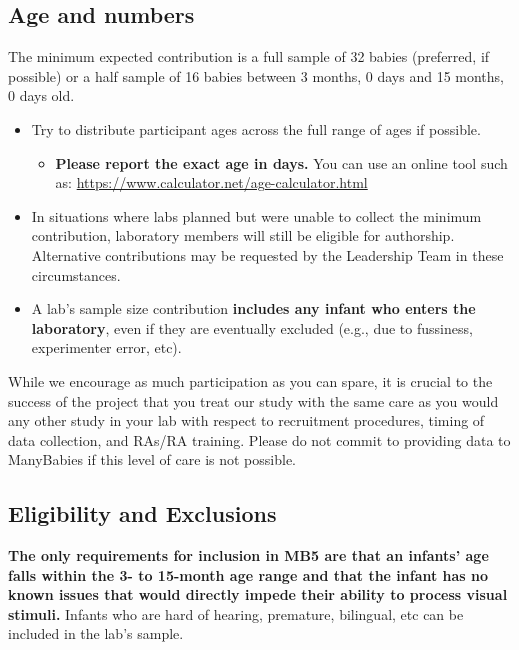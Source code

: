 \documentclass[
]{book}
\providecommand{\tightlist}{%
  \setlength{\itemsep}{0pt}\setlength{\parskip}{0pt}}
\begin{document}
\hypertarget{age-and-numbers}{%
\subsection{Age and numbers}\label{age-and-numbers}}

The minimum expected contribution is a full sample of 32 babies (preferred, if possible) or a half sample of 16 babies between 3 months, 0 days and 15 months, 0 days old.

\begin{itemize}
\tightlist
\item
  Try to distribute participant ages across the full range of ages if possible.

  \begin{itemize}
  \tightlist
  \item
    \textbf{Please report the exact age in days.} You can use an online tool such as: \url{https://www.calculator.net/age-calculator.html}
  \end{itemize}
\item
  In situations where labs planned but were unable to collect the minimum contribution, laboratory members will still be eligible for authorship. Alternative contributions may be requested by the Leadership Team in these circumstances.
\item
  A lab's sample size contribution \textbf{includes any infant who enters the laboratory}, even if they are eventually excluded (e.g., due to fussiness, experimenter error, etc).
\end{itemize}

While we encourage as much participation as you can spare, it is crucial to the success of the project that you treat our study with the same care as you would any other study in your lab with respect to recruitment procedures, timing of data collection, and RAs/RA training. Please do not commit to providing data to ManyBabies if this level of care is not possible.

\hypertarget{eligibility-and-exclusions}{%
\subsection{Eligibility and Exclusions}\label{eligibility-and-exclusions}}

\textbf{The only requirements for inclusion in MB5 are that an infants' age falls within the 3- to 15-month age range and that the infant has no known issues that would directly impede their ability to process visual stimuli.} Infants who are hard of hearing, premature, bilingual, etc can be included in the lab's sample.
\end{document}
